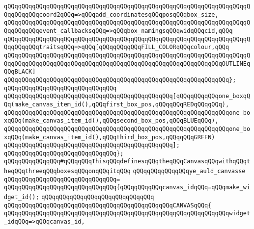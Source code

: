 \verb|qQQqqQQqqQQqqQQqqQQqqQQqqQQqqQQqqQQqqQQqqQQqqQQqqQQqqQQqqQQqqQQqqQQqqQQqqQQqqQQqcoord2qQQq=>qQQqadd_coordinatesqQQqposqQQqbox_size,|\newline
\verb|qQQqqQQqqQQqqQQqqQQqqQQqqQQqqQQqqQQqqQQqqQQqqQQqqQQqqQQqqQQqqQQqqQQqqQQqqQQqqQQqevent_callbacksqQQq=>qQQqbox_namingsqQQqwidqQQqcid,qQQq|\newline
\verb|qQQqqQQqqQQqqQQqqQQqqQQqqQQqqQQqqQQqqQQqqQQqqQQqqQQqqQQqqQQqqQQqqQQqqQQqqQQqqQQqtraitsqQQq=>qQQq[qQQqqQQqqQQqFILL_COLORqQQqcolour,qQQq|\newline
\verb|qQQqqQQqqQQqqQQqqQQqqQQqqQQqqQQqqQQqqQQqqQQqqQQqqQQqqQQqqQQqqQQqqQQqqQQqqQQqqQQqqQQqqQQqqQQqqQQqqQQqqQQqqQQqqQQqqQQqqQQqqQQqqQQqqQQqOUTLINEqQQqBLACK]|\newline
\verb|qQQqqQQqqQQqqQQqqQQqqQQqqQQqqQQqqQQqqQQqqQQqqQQqqQQqqQQqqQQqqQQq};|\newline
\newline
\verb|qQQqqQQqqQQqqQQqqQQqqQQqqQQqqQQq|\newline
\verb|qQQqqQQqqQQqqQQqqQQqqQQqqQQqqQQqqQQqqQQqqQQqqQQq[qQQqqQQqqQQqone_boxqQQq(make_canvas_item_id(),qQQqfirst_box_pos,qQQqqQQqREDqQQqqQQq),|\newline
\verb|qQQqqQQqqQQqqQQqqQQqqQQqqQQqqQQqqQQqqQQqqQQqqQQqqQQqqQQqqQQqqQQqone_boxqQQq(make_canvas_item_id(),qQQqsecond_box_pos,qQQqBLUEqQQq),|\newline
\verb|qQQqqQQqqQQqqQQqqQQqqQQqqQQqqQQqqQQqqQQqqQQqqQQqqQQqqQQqqQQqqQQqone_boxqQQq(make_canvas_item_id(),qQQqthird_box_pos,qQQqqQQqGREEN)|\newline
\verb|qQQqqQQqqQQqqQQqqQQqqQQqqQQqqQQqqQQqqQQqqQQqqQQq];|\newline
\verb|qQQqqQQqqQQqqQQqqQQqqQQqqQQqqQQq};|\newline
\newline
\verb|qQQqqQQqqQQqqQQq#qQQqqQQqThisqQQqdefinesqQQqtheqQQqCanvasqQQqwithqQQqtheqQQqthreeqQQqboxesqQQqonqQQqitqQQq|\newline
\newline
\verb|qQQqqQQqqQQqqQQqye_auld_canvasse|\newline
\verb|qQQqqQQqqQQqqQQqqQQqqQQqqQQqqQQq=|\newline
\verb|qQQqqQQqqQQqqQQqqQQqqQQqqQQqqQQq{qQQqqQQqqQQqcanvas_idqQQq=qQQqmake_widget_id();|\newline
\verb|qQQqqQQqqQQqqQQqqQQqqQQqqQQqqQQq|\newline
\verb|qQQqqQQqqQQqqQQqqQQqqQQqqQQqqQQqqQQqqQQqqQQqqQQqCANVASqQQq{|\newline
\verb|qQQqqQQqqQQqqQQqqQQqqQQqqQQqqQQqqQQqqQQqqQQqqQQqqQQqqQQqqQQqqQQqwidget_idqQQq=>qQQqcanvas_id,|\newline
